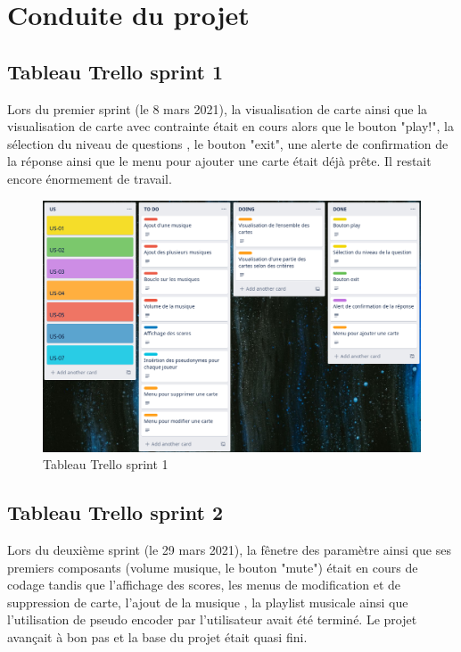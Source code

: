 \newpage
\section{Conduite du projet}
\subsection{Tableau Trello sprint 1}
Lors du premier sprint (le 8 mars 2021), la visualisation de carte ainsi que la visualisation de carte avec contrainte était en cours alors que le bouton "play!", la sélection du niveau de questions , le bouton "exit", une alerte de confirmation 
de la réponse ainsi que le menu pour ajouter une carte était déjà prête. 
Il restait encore énormement de travail.

\begin{figure}[h]
	\centering
	\includegraphics[width=\textwidth]{trello1.png}
	\caption{Tableau Trello sprint 1}
	\label{fig:Trello_sprint_1}
\end{figure}

\newpage
\subsection{Tableau Trello sprint 2}
Lors du deuxième sprint (le 29 mars 2021),  la fênetre des paramètre ainsi que ses premiers composants (volume musique, le bouton "mute") était en cours de codage tandis que l'affichage des scores, les menus de modification et de suppression de 
carte, l'ajout de la musique , la playlist musicale ainsi que l'utilisation de pseudo encoder par l'utilisateur avait été terminé.
Le projet avançait à bon pas et la base du projet était quasi fini. 

